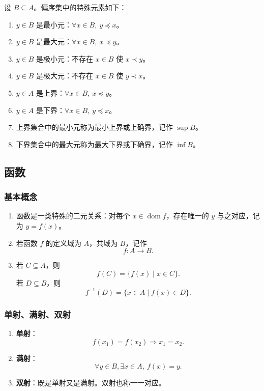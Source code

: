 设 \(B\subseteq A\)。偏序集中的特殊元素如下：
\begin{enumerate}
	\item \(y\in B\) 是最小元：\(\forall x\in B,\ y\preceq x\)。
	\item \(y\in B\) 是最大元：\(\forall x\in B,\ x\preceq y\)。
	\item \(y\in B\) 是极小元：不存在 \(x\in B\) 使 \(x\prec y\)。
	\item \(y\in B\) 是极大元：不存在 \(x\in B\) 使 \(y\prec x\)。
	\item \(y\in A\) 是上界：\(\forall x\in B,\ x\preceq y\)。
	\item \(y\in A\) 是下界：\(\forall x\in B,\ y\preceq x\)。
	\item 上界集合中的最小元称为最小上界或上确界，记作 \(\sup B\)。
	\item 下界集合中的最大元称为最大下界或下确界，记作 \(\inf B\)。
\end{enumerate}

\subsection{函数}

\subsubsection{基本概念}

\begin{enumerate}
	\item 函数是一类特殊的二元关系：对每个 \(x\in\operatorname{dom}f\)，存在唯一的 \(y\) 与之对应，记为 \(y=f(x)\)。
	\item 若函数 \(f\) 的定义域为 \(A\)，共域为 \(B\)，记作
	\[
	f:A\to B.
	\]
	\item 若 \(C\subseteq A\)，则
	\[
	f(C)=\{f(x)\mid x\in C\}.
	\]
	若 \(D\subseteq B\)，则
	\[
	f^{-1}(D)=\{x\in A\mid f(x)\in D\}.
	\]
\end{enumerate}

\subsubsection{单射、满射、双射}

\begin{enumerate}
	\item \textbf{单射}：
	\[
	f(x_1)=f(x_2)\Rightarrow x_1=x_2.
	\]
	\item \textbf{满射}：
	\[
	\forall y\in B,\exists x\in A,\ f(x)=y.
	\]
	\item \textbf{双射}：既是单射又是满射。双射也称一一对应。
\end{enumerate}

